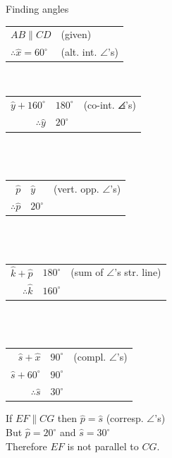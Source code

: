 \begin{wex}{Finding angles}
{
\begin{tabular}{l l}
 $AB \parallel CD$ & (given) \\
$\therefore \hat{x}=60^{\circ}$ & (alt. int. $\angle$'s) \\
\end{tabular} \\
\begin{tabular}{r@{ = }ll}
$\hat{y} + 160^\circ$ & $180^{\circ}$  & (co-int. $\angles$'s) \\
$\therefore \hat{y}$ & $20^{\circ}$ &  \\
\end{tabular} \\ \\
\begin{tabular}{r@{ = }ll}
$\hat{p}$ & $\hat{y}$ & (vert. opp. $\angle$'s) \\
$\therefore \hat{p}$ & $20^{\circ}$ & \\
\end{tabular} \\ \\
\begin{tabular}{r@{ = }ll}
 $\hat{k} + \hat{p}$ & $180^{\circ}$  & (sum of $\angle$'s str. line) \\
$\therefore \hat{k}$ & $160^{\circ}$ & \\
\end{tabular} \\ \\
\begin{tabular}{r@{ = }ll}
 $\hat{s} + \hat{x}$ & $90^{\circ}$  & (compl. $\angle$'s) \\ 
 $\hat{s} + 60^\circ$ & $90^{\circ}$ & \\
$\therefore \hat{s}$ & $30^{\circ}$ & 
\end{tabular}
If $EF \parallel CG$ then $\hat{p} = \hat{s}$ (corresp. $\angle$'s) \\
But $\hat{p} = 20^{\circ}$ and $\hat{s} = 30^{\circ}$ \\
Therefore $EF$ is not parallel to $CG$.
}
\end{wex}

